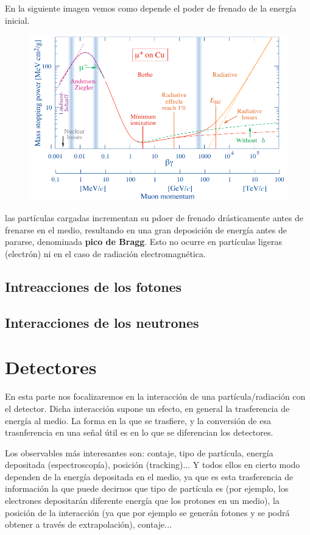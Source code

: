 En la siguiente imagen vemos como depende el poder de frenado de la energía inicial. 

\begin{figure}[H] \centering
    \includegraphics[width=0.7\linewidth]{Cuerpo/Ch_01/Interaccion_01.png}
\end{figure}
las partículas cargadas incrementan su pdoer de frenado drásticamente antes de frenarse en el medio, resultando en una gran deposición de energía antes de pararse, denominada \textbf{pico de Bragg}. Esto no ocurre en partículas ligeras (electrón) ni en el caso de radiación electromagnética. 


     
\subsection{Intreacciones de los fotones}



\subsection{Interacciones de los neutrones}

\section{Detectores}

En esta parte nos focalizaremos en la interacción de una partícula/radiación con el detector. Dicha interacción supone un efecto, en general la trasferencia de energía al medio. La forma en la que se trasfiere, y la conversión de esa trasnferencia en una señal útil es en lo que se diferencian los detectores. 

Los observables más interesantes son: contaje, tipo de partícula, energía depositada (espectroscopía), posición (tracking)... Y todos ellos en cierto modo dependen de la energía depositada en el medio, ya que es esta trasferencia de información la que puede decirnos que tipo de partícula es (por ejemplo, los electrones depositarán diferente energía que los protones en un medio), la posición de la interacción (ya que por ejemplo se generán fotones y se podrá obtener a través de extrapolación), contaje... 

